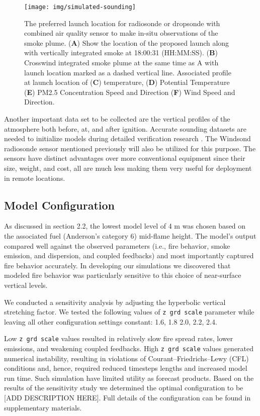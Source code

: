 \documentclass[preprints,article,accept,moreauthors,pdftex]{Definitions/mdpi}
\begin{document}
\begin{figure}[H]
\centering
 \texttt{[image: img/simulated-sounding]}
 \caption{The preferred launch location for radiosonde or dropsonde with combined air quality sensor to make in-situ observations of the smoke plume. (\textbf{A}) Show the location of the proposed launch along with vertically integrated smoke at 18:00:31 (HH:MM:SS). (\textbf{B}) Crosswind integrated smoke plume at the same time as A with launch location marked as a dashed vertical line. Associated profile at launch location of (\textbf{C}) temperature, (\textbf{D}) Potential Temperature (\textbf{E}) PM2.5 Concentration Speed and Direction (\textbf{F}) Wind Speed and Direction. \label{fig8}}
 \end{figure}

Another important data set to be collected are the vertical profiles of the atmosphere both before, at, and after ignition. Accurate sounding datasets are needed to initialize models during detailed verification research \cite{kochanski_experimental_2018,moisseeva_capturing_2019}. The Windsond radiosonde sensor mentioned previously will also be utilized for this purpose. The sensors have distinct advantages over more conventional equipment since their size, weight, and cost, all are much less making them very useful for deployment in remote locations.

\subsection{Model Configuration}

As discussed in section 2.2, the lowest model level of 4 m was chosen based on  the associated fuel (Anderson's category 6) mid-flame height. The model’s output compared well against the observed parameters (i.e., fire behavior, smoke emission, and dispersion, and coupled feedbacks) and most importantly captured fire behavior accurately. In developing our simulations we discovered that modeled fire behavior was particularly sensitive to this choice of near-surface vertical levels.

We conducted a sensitivity analysis by adjusting the hyperbolic vertical stretching factor. We tested the following values of \texttt{z grd scale} parameter while leaving all other configuration settings constant: 1.6, 1.8 2.0, 2.2, 2.4.

Low \texttt{z grd scale} values resulted in relatively slow fire spread rates, lower emissions, and weakening coupled feedbacks. High \texttt{z grd scale} values generated numerical instability, resulting in violations of Courant–Friedrichs–Lewy (CFL) conditions and, hence, required reduced timesteps lengths and increased model run time. Such simulation have limited utility as forecast products. Based on the results of the sensitivity study we determined the optimal configuration to be [ADD DESCRIPTION HERE]. Full details of the configuration can be found in supplementary materials.
\end{document}
